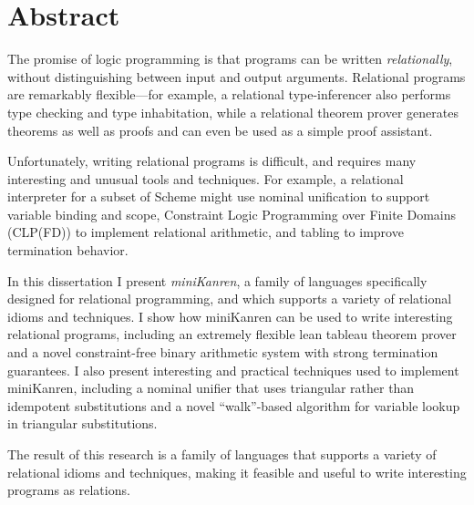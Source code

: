 \chapter*{Abstract}


\noindent The promise of logic programming is that programs can be
written {\em relationally}, without distinguishing between input and
output arguments.  Relational programs are remarkably flexible---for
example, a relational type-inferencer also performs type checking and
type inhabitation, while a relational theorem prover generates
theorems as well as proofs and can even be used as a simple proof
assistant.

Unfortunately, writing relational programs is difficult, and requires
many interesting and unusual tools and techniques.  For example, a
relational interpreter for a subset of Scheme might use nominal
unification to support variable binding and scope, Constraint Logic
Programming over Finite Domains (CLP(FD)) to implement relational
arithmetic, and tabling to improve termination behavior.

In this dissertation I present {\em miniKanren}, a family of languages
specifically designed for relational programming, and which supports a
variety of relational idioms and techniques.  I show how miniKanren
can be used to write interesting relational programs, including an
extremely flexible lean tableau theorem prover and a novel
constraint-free binary arithmetic system with strong termination
guarantees.  I also present interesting and practical techniques used
to implement miniKanren, including a nominal unifier that uses
triangular rather than idempotent substitutions and a novel
``walk''-based algorithm for variable lookup in triangular
substitutions.

The result of this research is a family of languages that supports a
variety of relational idioms and techniques, making it feasible and
useful to write interesting programs as relations.




